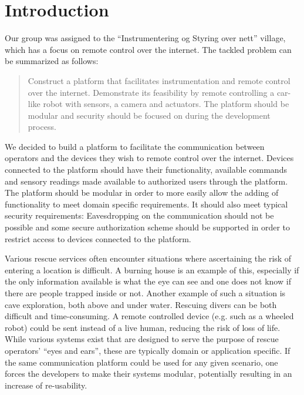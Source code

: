 \chapter{Introduction}
Our group was assigned to the ``Instrumentering og Styring over nett'' village, which has a focus on remote control over the internet.
The tackled problem can be summarized as follows:
\begin{quote}
Construct a platform that facilitates instrumentation and remote control over the internet.
Demonstrate its feasibility by remote controlling a car-like robot with sensors, a camera and actuators.
The platform should be modular and security should be focused on during the development process.
\end{quote}

We decided to build a platform to facilitate the communication between operators and the devices they wish to remote control over the internet.
Devices connected to the platform should have their functionality, available commands and sensory readings made available to authorized users through the platform.
The platform should be modular in order to more easily allow the adding of functionality to meet domain specific requirements.
It should also meet typical security requirements: Eavesdropping on the communication should not be possible and some secure authorization scheme should be supported in order to restrict access to devices connected to the platform.

Various rescue services often encounter situations where ascertaining the risk of entering a location is difficult. A burning house is an example of this, especially if the only information available is what the eye can see and one does not know if there are people trapped inside or not.
Another example of such a situation is cave exploration, both above and under water.
Rescuing divers can be both difficult and time-consuming.  %
A remote controlled device (e.g. such as a wheeled robot) could be sent instead of a live human, reducing the risk of loss of life.
While various systems exist that are designed to serve the purpose of rescue operators' ``eyes and ears'', these are typically domain or application specific.
If the same communication platform could be used for any given scenario, one forces the developers to make their systems modular, potentially resulting in an increase of re-usability.


